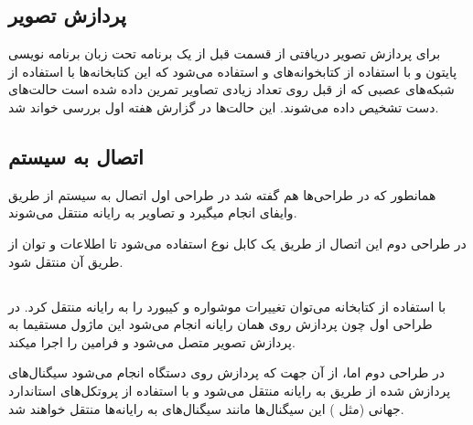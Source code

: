 \documentclass{article}
\begin{document}
\subsection{پردازش تصویر}
برای پردازش تصویر دریافتی از قسمت قبل از یک برنامه تحت زبان برنامه نویسی پایتون و با استفاده از کتابخوانه‌های
 و
استفاده می‌شود که این کتابخانه‌ها با استفاده از شبکه‌های عصبی که از قبل روی تعداد زیادی تصاویر تمرین داده شده است حالت‌های دست تشخیص داده می‌شوند. این حالت‌ها در گزارش هفته اول بررسی خواند شد.

\subsection{اتصال به سیستم}
همانطور که در طراحی‌ها هم گفته شد در طراحی اول اتصال به سیستم 
از طریق وایفای انجام میگیرد و تصاویر به رایانه منتقل می‌شوند.

در طراحی دوم این اتصال از طریق یک کابل نوع  استفاده می‌شود تا اطلاعات و توان از طریق آن منتقل شود.

\subsection{}
با استفاده از کتابخانه  می‌توان تغییرات موشواره و کیبورد را به رایانه منتقل کرد. در طراحی اول چون پردازش روی همان رایانه انجام می‌شود این ماژول مستقیما به پردازش تصویر متصل می‌شود و فرامین را اجرا میکند.

در طراحی دوم اما، از آن جهت که پردازش روی دستگاه انجام می‌شود سیگنال‌های پردازش شده از طریق  به رایانه منتقل می‌شود و با استفاده از پروتکل‌های استاندارد جهانی (مثل ) این سیگنال‌ها مانند سیگنال‌های  به رایانه‌ها منتقل خواهند شد.

 
\end{document}

